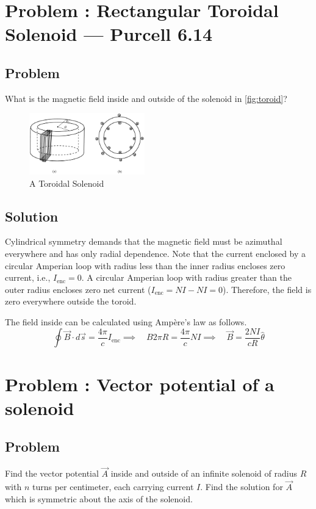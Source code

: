 \documentclass[solutions]{esg8022pset}
\begin{document}
\section{Problem \thesection: Rectangular Toroidal Solenoid --- Purcell 6.14}
\subsection{Problem}
  What is the magnetic field inside and outside of the solenoid in \autoref{fig:toroid}?
  \begin{figure}[H]
    \centering
    \includegraphics[width = 5cm]{Toroid}
    \caption{A Toroidal Solenoid}
    \label{fig:toroid}
  \end{figure}
\subsection{Solution}
  Cylindrical symmetry demands that the magnetic field must be azimuthal
  everywhere and has only radial dependence.  Note that the current enclosed by
  a circular Amperian loop with radius less than the inner radius encloses zero
  current, i.e., $I_{\text{enc}} = 0$.  A circular Amperian loop with radius
  greater than the outer radius encloses zero net current ($I_{\text{enc}} = NI
  - NI = 0$). Therefore, the field is zero everywhere outside the toroid.

  The field inside can be calculated using Amp\`{e}re's law as follows.
  $$\oint \vec{B} \cdot d\vec{s} = \frac{4\pi}{c}I_{\text{enc}}  \implies \quad B 2 \pi R
  = \frac{4\pi}{c}NI  \implies \quad \vec{B} =
  \frac{2NI}{cR}\hat{\theta} $$
\section{Problem \thesection: Vector potential of a solenoid}
\subsection{Problem}
  Find the vector potential $\vec A$ inside and outside of an infinite solenoid
  of radius $R$ with $n$ turns per centimeter, each carrying current $I$.  Find
  the solution for $\vec A$ which is symmetric about the axis of the solenoid.
\end{document}
